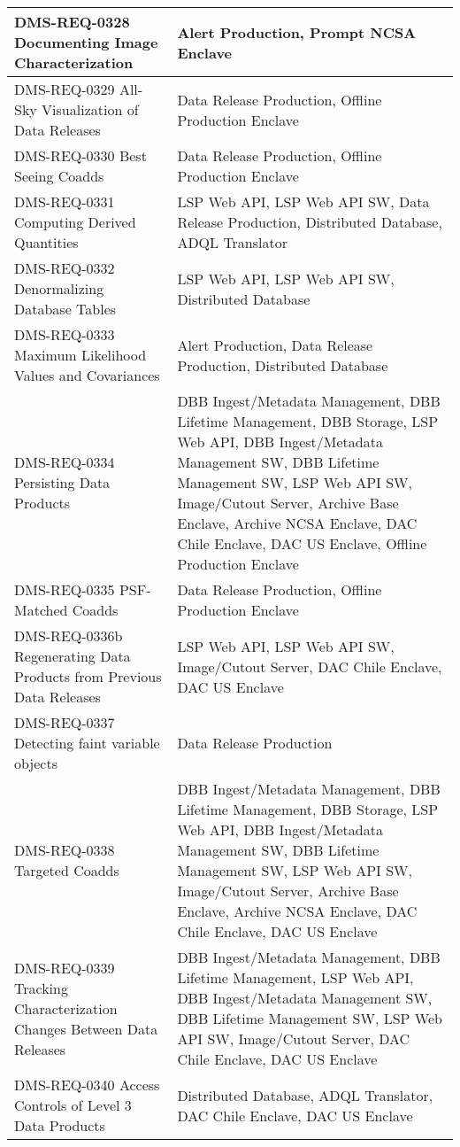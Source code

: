 \begin{longtable}{p{}p{}}
DMS-REQ-0328 Documenting Image Characterization & Alert Production, Prompt NCSA Enclave \\ \hline
DMS-REQ-0329 All-Sky Visualization of Data Releases & Data Release Production, Offline Production Enclave \\ \hline
DMS-REQ-0330 Best Seeing Coadds & Data Release Production, Offline Production Enclave \\ \hline
DMS-REQ-0331 Computing Derived Quantities & LSP Web API, LSP Web API SW, Data Release Production, Distributed Database, ADQL Translator \\ \hline
DMS-REQ-0332 Denormalizing Database Tables & LSP Web API, LSP Web API SW, Distributed Database \\ \hline
DMS-REQ-0333 Maximum Likelihood Values and Covariances & Alert Production, Data Release Production, Distributed Database \\ \hline
DMS-REQ-0334 Persisting Data Products & DBB Ingest/Metadata Management, DBB Lifetime Management, DBB Storage, LSP Web API, DBB Ingest/Metadata Management SW, DBB Lifetime Management SW, LSP Web API SW, Image/Cutout Server, Archive Base Enclave, Archive NCSA Enclave, DAC Chile Enclave, DAC US Enclave, Offline Production Enclave \\ \hline
DMS-REQ-0335 PSF-Matched Coadds & Data Release Production, Offline Production Enclave \\ \hline
DMS-REQ-0336b Regenerating Data Products from Previous Data Releases & LSP Web API, LSP Web API SW, Image/Cutout Server, DAC Chile Enclave, DAC US Enclave \\ \hline
DMS-REQ-0337 Detecting faint variable objects & Data Release Production \\ \hline
DMS-REQ-0338 Targeted Coadds & DBB Ingest/Metadata Management, DBB Lifetime Management, DBB Storage, LSP Web API, DBB Ingest/Metadata Management SW, DBB Lifetime Management SW, LSP Web API SW, Image/Cutout Server, Archive Base Enclave, Archive NCSA Enclave, DAC Chile Enclave, DAC US Enclave \\ \hline
DMS-REQ-0339 Tracking Characterization Changes Between Data Releases & DBB Ingest/Metadata Management, DBB Lifetime Management, LSP Web API, DBB Ingest/Metadata Management SW, DBB Lifetime Management SW, LSP Web API SW, Image/Cutout Server, DAC Chile Enclave, DAC US Enclave \\ \hline
DMS-REQ-0340 Access Controls of Level 3 Data Products & Distributed Database, ADQL Translator, DAC Chile Enclave, DAC US Enclave \\ \hline

\end{longtable}
